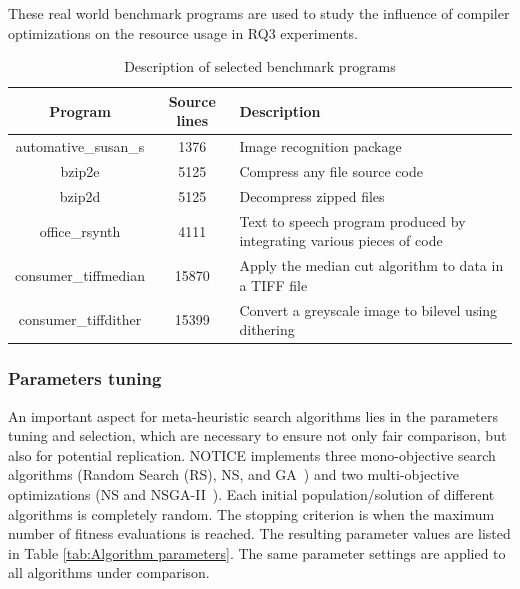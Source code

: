 These real world benchmark programs are used to study the influence of compiler optimizations on the resource usage in RQ3 experiments.
 
\begin{table}[h]
	\begin{center}
		\begin{tabular}{|c|c|p{5cm}|}
			\hline
			\textbf{Program} & \textbf{Source lines} & \textbf{Description}\\
			\hline
			automative\_susan\_s & 1376 & Image recognition package\\
			\hline
			bzip2e & 5125 & Compress any file
			source code \\
			\hline
			bzip2d & 5125 & Decompress zipped files \\
			\hline
			office\_rsynth & 4111 & Text to speech program produced by integrating various pieces of code\\
			\hline
			consumer\_tiffmedian& 15870 & Apply the median cut algorithm to data in a TIFF file
			\\
			
			\hline
			consumer\_tiffdither& 15399 & Convert a greyscale image to bilevel using dithering
			\\
			\hline	
		\end{tabular}
	\end{center}
	\caption {Description of selected benchmark programs}
	\label{tab:Description of selected benchmark programs}
\end{table}


\subsubsection{Parameters tuning}
An important aspect for meta-heuristic search algorithms lies in the parameters tuning and selection, which are necessary to ensure not only fair comparison, but also for potential replication.
NOTICE implements three mono-objective search algorithms (Random Search (RS), NS, and GA~\cite{cooper2002adaptive}) and two multi-objective optimizations (NS and NSGA-II~\cite{deb2002fast}). Each initial population/solution of different algorithms is completely random. The stopping criterion is when the maximum number of fitness evaluations is reached.
The resulting parameter values are listed in Table \ref{tab:Algorithm parameters}. The same parameter settings are applied to all algorithms under comparison.

